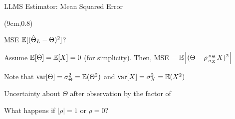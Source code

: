 \begin{frame}{LLMS Estimator: Mean Squared Error}

 \begin{textblock*}{\textwidth}(9cm,0.8\textheight)
  \end{textblock*}
  

  \bci
\item<1-> MSE $\mathbb{E}[ (\hat{\Theta}_L - \Theta)^2 ]$?
  \bci
  
  \item<2-> Assume   $\mathbb{E}[ \Theta ] = \mathbb{E}[ X ]=0$ (for
    simplicity). Then, MSE = $\mathbb{E}\Bigl[ (\Theta - \rho \frac{\sigma_\Theta}{\sigma_X} X)^2 \Bigr]$
  \item<3-> Note that $\text{var}[ \Theta ] = \sigma^2_\Theta =
    \mathbb{E}( \Theta^2 )$ and  $\text{var}[ X ] = \sigma^2_X =
    \mathbb{E}( X^2 )$

    


\eci



\item<7-> Uncertainty about $\Theta$ after observation  by the factor of 


\item<8-> What happens if $|\rho|=1$ or $\rho=0$?



  \eci



\end{frame}

